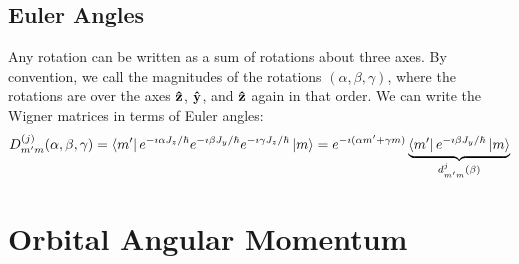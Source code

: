 \documentclass[a4paper,twoside,master.tex]{subfiles}
\begin{document}
\subsection{Euler Angles}
\label{sub:euler_angles}

Any rotation can be written as a sum of rotations about three axes. By convention, we call the magnitudes of the rotations $(\alpha, \beta, \gamma) $, where the rotations are over the axes $ \vu{z} $, $ \vu{y} $, and $ \vu{z} $ again in that order. We can write the Wigner matrices in terms of Euler angles:
\begin{equation}
    D^{(j)}_{m'm}(\alpha, \beta, \gamma) =\bra{m'} e^{- \imath \alpha J_z / \hbar} e^{- \imath \beta J_y / \hbar} e^{- \imath \gamma J_z / \hbar}\ket{m} = e^{- \imath (\alpha m' + \gamma m)} \underbrace{\bra{m'} e^{- \imath \beta J_y / \hbar}\ket{m}}_{d^{j}_{m'm}(\beta)}
\end{equation}

\section{Orbital Angular Momentum}
\label{sec:orbital_angular_momentum}
\end{document}
